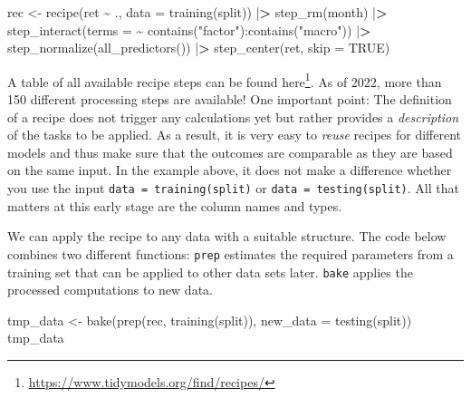 \documentclass[
]{book}
\newenvironment{Shaded}{\begin{snugshade}}{\end{snugshade}}
\newcommand{\AttributeTok}[1]{\textcolor[rgb]{0.61,0.61,0.61}{#1}}
\newcommand{\ConstantTok}[1]{\textcolor[rgb]{0,0,0}{#1}}
\newcommand{\ErrorTok}[1]{\textcolor[rgb]{0.14,0.14,0.14}{\textbf{#1}}}
\newcommand{\FunctionTok}[1]{\textcolor[rgb]{0,0,0}{#1}}
\newcommand{\NormalTok}[1]{#1}
\newcommand{\OtherTok}[1]{\textcolor[rgb]{0.37,0.37,0.37}{#1}}
\newcommand{\SpecialCharTok}[1]{\textcolor[rgb]{0,0,0}{#1}}
\newcommand{\StringTok}[1]{\textcolor[rgb]{0.5,0.5,0.5}{#1}}
\renewcommand{\href}[2]{#2\footnote{\url{#1}}}
\begin{document}
\begin{Shaded}
\begin{Highlighting}[]
\NormalTok{rec }\OtherTok{\textless{}{-}} \FunctionTok{recipe}\NormalTok{(ret }\SpecialCharTok{\textasciitilde{}}\NormalTok{ ., }\AttributeTok{data =} \FunctionTok{training}\NormalTok{(split)) }\SpecialCharTok{|}\ErrorTok{\textgreater{}}
  \FunctionTok{step\_rm}\NormalTok{(month) }\SpecialCharTok{|}\ErrorTok{\textgreater{}}
  \FunctionTok{step\_interact}\NormalTok{(}\AttributeTok{terms =} \SpecialCharTok{\textasciitilde{}} \FunctionTok{contains}\NormalTok{(}\StringTok{"factor"}\NormalTok{)}\SpecialCharTok{:}\FunctionTok{contains}\NormalTok{(}\StringTok{"macro"}\NormalTok{)) }\SpecialCharTok{|}\ErrorTok{\textgreater{}}
  \FunctionTok{step\_normalize}\NormalTok{(}\FunctionTok{all\_predictors}\NormalTok{()) }\SpecialCharTok{|}\ErrorTok{\textgreater{}}
  \FunctionTok{step\_center}\NormalTok{(ret, }\AttributeTok{skip =} \ConstantTok{TRUE}\NormalTok{)}
\end{Highlighting}
\end{Shaded}

A table of all available recipe steps can be found \href{https://www.tidymodels.org/find/recipes/}{here}. As of 2022, more than 150 different processing steps are available! One important point: The definition of a recipe does not trigger any calculations yet but rather provides a \emph{description} of the tasks to be applied. As a result, it is very easy to \emph{reuse} recipes for different models and thus make sure that the outcomes are comparable as they are based on the same input.
In the example above, it does not make a difference whether you use the input \texttt{data\ =\ training(split)} or \texttt{data\ =\ testing(split)}.
All that matters at this early stage are the column names and types.

We can apply the recipe to any data with a suitable structure. The code below combines two different functions: \texttt{prep} estimates the required parameters from a training set that can be applied to other data sets later. \texttt{bake} applies the processed computations to new data.

\begin{Shaded}
\begin{Highlighting}[]
\NormalTok{tmp\_data }\OtherTok{\textless{}{-}} \FunctionTok{bake}\NormalTok{(}\FunctionTok{prep}\NormalTok{(rec, }\FunctionTok{training}\NormalTok{(split)), }\AttributeTok{new\_data =} \FunctionTok{testing}\NormalTok{(split))}
\NormalTok{tmp\_data}
\end{Highlighting}
\end{Shaded}
\end{document}
